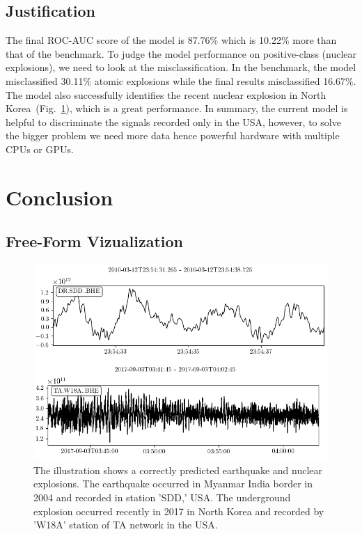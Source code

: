 \documentclass[12pt]{article}
\begin{document}
        \subsection{Justification}
        The final ROC-AUC score of the model is 87.76$\%$ which is 10.22$\%$ more than that of the benchmark. To judge the model performance on positive-class (nuclear explosions), we need to look at the misclassification. In the benchmark, the model misclassified 30.11$\%$ atomic explosions while the final results misclassified 16.67$\%$. The model also successfully identifies the recent nuclear explosion in North Korea~(Fig.~\ref{fig:predicted_seismogram}), which is a great performance. In summary, the current model is helpful to discriminate the signals recorded only in the USA, however, to solve the bigger problem we need more data hence powerful hardware with multiple CPUs or GPUs.
    
        \section{Conclusion}
        \subsection{Free-Form Vizualization}

        \begin{figure}[H]
            \begin{center}
            \includegraphics[scale=0.5]{figures/predicted_seismogram.png}
            \end{center}
            \caption{The illustration shows a correctly predicted earthquake and nuclear explosions. The earthquake occurred in Myanmar India border in 2004 and recorded in station 'SDD,' USA. The underground explosion occurred recently in 2017 in North Korea and recorded by 'W18A' station of TA network in the USA.}
            \label{fig:predicted_seismogram}
        \end{figure}
\end{document}
